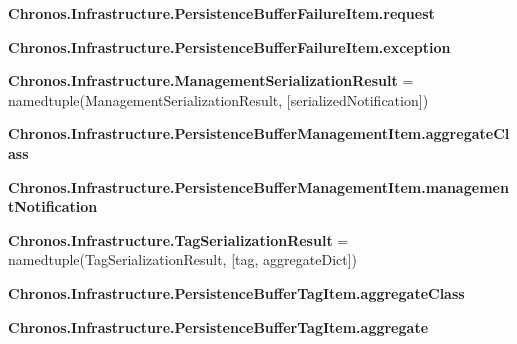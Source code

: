 \begin{DoxyCompactItemize}
\item 
{\bfseries Chronos.\+Infrastructure.\+Persistence\+Buffer\+Failure\+Item.\+request}\hypertarget{group__Chronos_gacb5cc689e6843f8aef384ac57ffb1459}{}\label{group__Chronos_gacb5cc689e6843f8aef384ac57ffb1459}

\item 
{\bfseries Chronos.\+Infrastructure.\+Persistence\+Buffer\+Failure\+Item.\+exception}\hypertarget{group__Chronos_ga27dbb64c9f8aa1811bf83ad8ec69088b}{}\label{group__Chronos_ga27dbb64c9f8aa1811bf83ad8ec69088b}

\item 
{\bfseries Chronos.\+Infrastructure.\+Management\+Serialization\+Result} = namedtuple(\textquotesingle{}Management\+Serialization\+Result\textquotesingle{}, \mbox{[}\textquotesingle{}serialized\+Notification\textquotesingle{}\mbox{]})\hypertarget{group__Chronos_ga2af083edf3d4db93c6d20b4c2307052f}{}\label{group__Chronos_ga2af083edf3d4db93c6d20b4c2307052f}

\item 
{\bfseries Chronos.\+Infrastructure.\+Persistence\+Buffer\+Management\+Item.\+aggregate\+Class}\hypertarget{group__Chronos_ga23e3fb9539994b563117b0212137f032}{}\label{group__Chronos_ga23e3fb9539994b563117b0212137f032}

\item 
{\bfseries Chronos.\+Infrastructure.\+Persistence\+Buffer\+Management\+Item.\+management\+Notification}\hypertarget{group__Chronos_gad5c6958fecd225943a4c8b00b3f9bf2c}{}\label{group__Chronos_gad5c6958fecd225943a4c8b00b3f9bf2c}

\item 
{\bfseries Chronos.\+Infrastructure.\+Tag\+Serialization\+Result} = namedtuple(\textquotesingle{}Tag\+Serialization\+Result\textquotesingle{}, \mbox{[}\textquotesingle{}tag\textquotesingle{}, \textquotesingle{}aggregate\+Dict\textquotesingle{}\mbox{]})\hypertarget{group__Chronos_ga91e6663352bab05022cd1dad32465177}{}\label{group__Chronos_ga91e6663352bab05022cd1dad32465177}

\item 
{\bfseries Chronos.\+Infrastructure.\+Persistence\+Buffer\+Tag\+Item.\+aggregate\+Class}\hypertarget{group__Chronos_gac2aa3a21a45193f301ddd4e483a7a1a5}{}\label{group__Chronos_gac2aa3a21a45193f301ddd4e483a7a1a5}

\item 
{\bfseries Chronos.\+Infrastructure.\+Persistence\+Buffer\+Tag\+Item.\+aggregate}\hypertarget{group__Chronos_ga812ab1f3c72ace427188f52dd4a7c8a1}{}\label{group__Chronos_ga812ab1f3c72ace427188f52dd4a7c8a1}


\end{DoxyCompactItemize}
